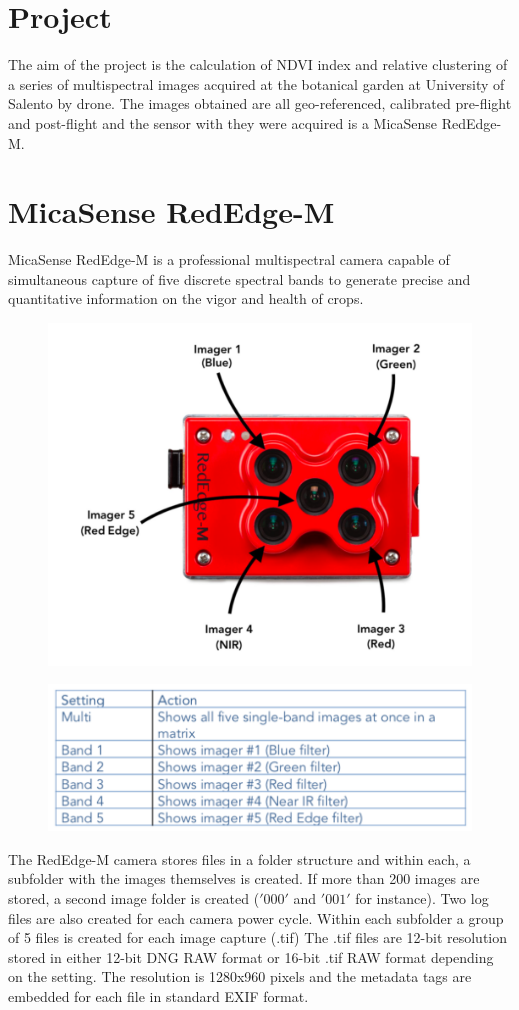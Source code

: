\documentclass[a4paper,11pt,oneside]{book}
\begin{document}
\pagestyle{myheadings}



\section*{Project}
The aim of the project is the calculation of NDVI index and relative clustering of a series of multispectral images acquired at the botanical garden at University of Salento by drone.
The images obtained are all geo-referenced, calibrated pre-flight and post-flight and the sensor with they were acquired is a MicaSense RedEdge-M.

\section*{MicaSense RedEdge-M}
MicaSense RedEdge-M is a professional multispectral camera capable of simultaneous capture of five discrete spectral bands to generate precise and quantitative information on the vigor and health of crops.

\begin{figure}[H]
	\centering
	\includegraphics[width=8 cm]{micasense.png}
	
\end{figure}

\begin{figure}[H]
	\centering
	\includegraphics[width=8 cm]{micasense1.png}
	
\end{figure}

The RedEdge-M camera stores files in a folder structure and within each, a subfolder with the images themselves is created. If more than 200 images are stored, a second image folder is created ($'000'$ and $'001'$ for instance). 
Two log files are also created for each camera power cycle. Within each subfolder a group of 5 files is created for each image capture (.tif)
The .tif files are 12-bit resolution stored in either 12-bit DNG RAW format or 16-bit .tif RAW format depending on the setting. The resolution is 1280x960 pixels and the metadata tags are embedded for each file in standard EXIF format.
\end{document}
